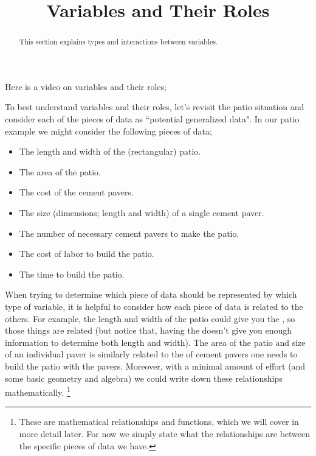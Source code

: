 \documentclass{ximera}
\title{Variables and Their Roles}
\begin{document}
\begin{abstract}
    This section explains types and interactions between variables.
\end{abstract}
\maketitle

Here is a video on variables and their roles;


To best understand variables and their roles, let's revisit the patio situation and consider each of the pieces of data as ``potential generalized data". In our patio example we might consider the following pieces of data;
\begin{itemize}
    \item The length and width of the (rectangular) patio.
    \item The area of the patio.
    \item The cost of the cement pavers.
    \item The size (dimensions; length and width) of a single cement paver.
    \item The number of necessary cement pavers to make the patio.
    \item The cost of labor to build the patio.
    \item The time to build the patio.
\end{itemize}

\begin{example}
    When trying to determine which piece of data should be represented by which type of variable, it is helpful to consider how each piece of data is related to the others. For example, the length and width of the patio could give you the , so those things are related (but notice that, having the  doesn't give you enough information to determine both length and width). The area of the patio and size of an individual paver is similarly related to the  of cement pavers one needs to build the patio with the pavers. Moreover, with a minimal amount of effort (and some basic geometry and algebra) we could write down these relationships mathematically.
    \footnote{These are mathematical relationships and functions, which we will cover in more detail later. For now we simply state what the relationships are between the specific pieces of data we have.}
\end{example}
\end{document}
